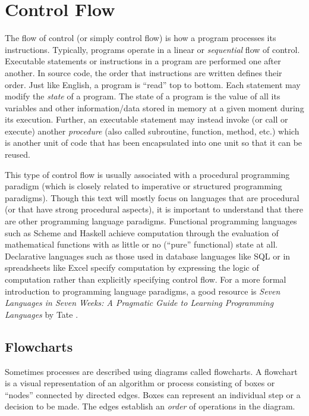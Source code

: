 

\section{Control Flow}

The flow of control (or simply  control flow) is 
how a program processes its instructions.
Typically, programs operate in a linear or \emph{sequential} flow of control.  Executable
statements or instructions in a program are performed one after another.  In source code, 
the order that instructions are written defines their order.  Just like English, a program
is ``read'' top to bottom.  Each statement may modify the \emph{state} of a program.  
The state of a program is the value of all its variables and other information/data stored 
in memory at a given moment during its execution.  Further, an executable statement
may instead invoke (or call or execute) another \emph{procedure} (also called 
subroutine, function, method, etc.) which is another unit of code that has been 
encapsulated into one unit so that it can be reused.

This type of control flow is usually associated with a procedural programming paradigm
(which is closely related to imperative or structured programming paradigms).  
Though this text will mostly focus on languages that are procedural (or that have
strong procedural aspects), it is important to understand that there are other 
programming language paradigms.  Functional programming languages such as
Scheme and Haskell achieve computation through the evaluation of mathematical 
functions with as little or no (``pure'' functional) state at all.  Declarative languages
such as those used in database languages like SQL or in spreadsheets like Excel
specify computation by expressing the logic of computation rather than explicitly 
specifying control flow.  For a more formal introduction to programming language 
paradigms, a good resource is \emph{Seven Languages in Seven Weeks: A Pragmatic Guide to Learning Programming Languages}
by Tate \cite{Tate:2010:SLS:1951955}.

\subsection{Flowcharts}

Sometimes processes are described using diagrams called \glspl{flowchart}.
A flowchart is a visual representation of an \gls{algorithm} or process consisting
of boxes or ``nodes'' connected by directed edges.  Boxes can represent an individual 
step or a decision to be made.  The edges establish an \emph{order} of operations
in the diagram.  

